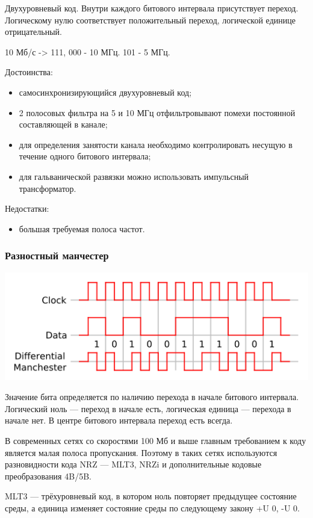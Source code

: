 \documentclass[12pt, russian, oneside, article]{ncc}
\begin{document}
Двухуровневый код. Внутри каждого битового интервала присутствует переход. Логическому нулю соответствует положительный переход, логической единице отрицательный.

10 Мб/с -> 111, 000 - 10 МГц. 101 - 5 МГц.

Достоинства:
\begin{itemize}
\item самосинхронизирующийся двухуровневый код;
\item 2 полосовых фильтра на 5 и 10 МГц отфильтровывают помехи постоянной составляющей в канале;
\item для определения занятости канала необходимо контролировать несущую в течение одного битового интервала;
\item для гальванической развязки можно использовать импульсный трансформатор.
\end{itemize}

Недостатки:
\begin{itemize}
\item большая требуемая полоса частот.
\end{itemize}
\subsubsection{Разностный манчестер}
\label{sec-4_7_4}


\includegraphics[]{images/SiSPI/Differential_manchester_encoding.png}

Значение бита определяется по наличию перехода в начале битового интервала. Логический ноль --- переход в начале есть, логическая единица --- перехода в начале нет. В центре битового интервала переход есть всегда.

В современных сетях со скоростями 100 Мб и выше главным требованием к коду является малая полоса пропускания. Поэтому в таких сетях используются разновидности кода NRZ --- MLT3, NRZi и дополнительные кодовые преобразования 4B/5B.

MLT3 --- трёхуровневый код, в котором ноль повторяет предыдущее состояние среды, а единица изменяет состояние среды по следующему закону +U 0, -U 0.
\end{document}
